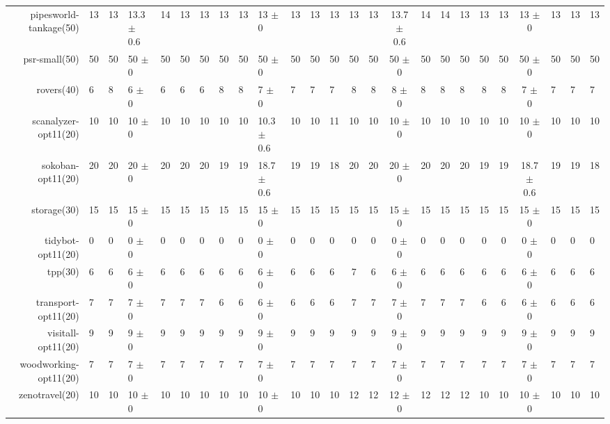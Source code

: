 \begin{center}
\begin{tabular}{|rHHHHHHHHHHHHcccHHH|cccHHH|}
pipesworld-tankage(50) & 13 & 13 & 13.3 $\pm$ 0.6 & 14 & 13 & 13 & 13 & 13 & 13 $\pm$ 0 & 13 & 13 & 13 & 13 & 13 & 13.7 $\pm$ 0.6 & 14 & 14 & 13 & 13 & 13 & 13 $\pm$ 0 & 13 & 13 & 13\\
psr-small(50) & 50 & 50 & 50 $\pm$ 0 & 50 & 50 & 50 & 50 & 50 & 50 $\pm$ 0 & 50 & 50 & 50 & 50 & 50 & 50 $\pm$ 0 & 50 & 50 & 50 & 50 & 50 & 50 $\pm$ 0 & 50 & 50 & 50\\
rovers(40) & 6 & 8 & 6 $\pm$ 0 & 6 & 6 & 6 & 8 & 8 & 7 $\pm$ 0 & 7 & 7 & 7 & 8 & 8 & 8 $\pm$ 0 & 8 & 8 & 8 & 8 & 8 & 7 $\pm$ 0 & 7 & 7 & 7\\
scanalyzer-opt11(20) & 10 & 10 & 10 $\pm$ 0 & 10 & 10 & 10 & 10 & 10 & 10.3 $\pm$ 0.6 & 10 & 10 & 11 & 10 & 10 & 10 $\pm$ 0 & 10 & 10 & 10 & 10 & 10 & 10 $\pm$ 0 & 10 & 10 & 10\\
sokoban-opt11(20) & 20 & 20 & 20 $\pm$ 0 & 20 & 20 & 20 & 19 & 19 & 18.7 $\pm$ 0.6 & 19 & 19 & 18 & 20 & 20 & 20 $\pm$ 0 & 20 & 20 & 20 & 19 & 19 & 18.7 $\pm$ 0.6 & 19 & 19 & 18\\
storage(30) & 15 & 15 & 15 $\pm$ 0 & 15 & 15 & 15 & 15 & 15 & 15 $\pm$ 0 & 15 & 15 & 15 & 15 & 15 & 15 $\pm$ 0 & 15 & 15 & 15 & 15 & 15 & 15 $\pm$ 0 & 15 & 15 & 15\\
tidybot-opt11(20) & 0 & 0 & 0 $\pm$ 0 & 0 & 0 & 0 & 0 & 0 & 0 $\pm$ 0 & 0 & 0 & 0 & 0 & 0 & 0 $\pm$ 0 & 0 & 0 & 0 & 0 & 0 & 0 $\pm$ 0 & 0 & 0 & 0\\
tpp(30) & 6 & 6 & 6 $\pm$ 0 & 6 & 6 & 6 & 6 & 6 & 6 $\pm$ 0 & 6 & 6 & 6 & 7 & 6 & 6 $\pm$ 0 & 6 & 6 & 6 & 6 & 6 & 6 $\pm$ 0 & 6 & 6 & 6\\
transport-opt11(20) & 7 & 7 & 7 $\pm$ 0 & 7 & 7 & 7 & 6 & 6 & 6 $\pm$ 0 & 6 & 6 & 6 & 7 & 7 & 7 $\pm$ 0 & 7 & 7 & 7 & 6 & 6 & 6 $\pm$ 0 & 6 & 6 & 6\\
visitall-opt11(20) & 9 & 9 & 9 $\pm$ 0 & 9 & 9 & 9 & 9 & 9 & 9 $\pm$ 0 & 9 & 9 & 9 & 9 & 9 & 9 $\pm$ 0 & 9 & 9 & 9 & 9 & 9 & 9 $\pm$ 0 & 9 & 9 & 9\\
woodworking-opt11(20) & 7 & 7 & 7 $\pm$ 0 & 7 & 7 & 7 & 7 & 7 & 7 $\pm$ 0 & 7 & 7 & 7 & 7 & 7 & 7 $\pm$ 0 & 7 & 7 & 7 & 7 & 7 & 7 $\pm$ 0 & 7 & 7 & 7\\
zenotravel(20) & 10 & 10 & 10 $\pm$ 0 & 10 & 10 & 10 & 10 & 10 & 10 $\pm$ 0 & 10 & 10 & 10 & 12 & 12 & 12 $\pm$ 0 & 12 & 12 & 12 & 10 & 10 & 10 $\pm$ 0 & 10 & 10 & 10\\
\hline
\end{tabular}
\end{center}
